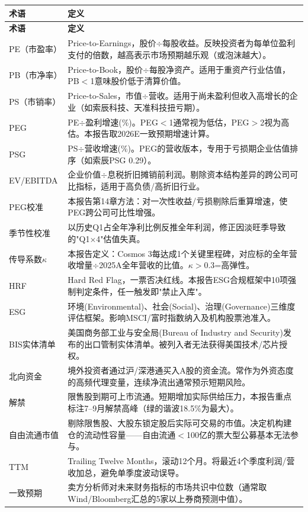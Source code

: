 \begin{longtable}{L{3.2cm} p{11.5cm}}
\toprule
\textbf{术语} & \textbf{定义} \\
\midrule
\endfirsthead
\midrule
\textbf{术语} & \textbf{定义} \\
\midrule
\endhead
\bottomrule
\endfoot

PE（市盈率） & Price-to-Earnings，股价$\div$每股收益。反映投资者为每单位盈利支付的倍数，越高表示市场预期越乐观（或泡沫越大）。 \\
PB（市净率） & Price-to-Book，股价$\div$每股净资产。适用于重资产行业估值，PB$<$1意味股价低于清算价值。 \\
PS（市销率） & Price-to-Sales，市值$\div$营收。适用于尚未盈利但收入高增长的企业（如索辰科技、天准科技扭亏期）。 \\
PEG & PE$\div$盈利增速(\%)。PEG$<$1通常视为低估，PEG$>$2视为高估。本报告取2026E一致预期增速计算。 \\
PSG & PS$\div$营收增速(\%)。PEG的营收版本，专用于亏损期企业估值排序（如索辰PSG 0.29）。 \\
EV/EBITDA & 企业价值$\div$息税折旧摊销前利润。剔除资本结构差异的跨公司可比指标，适用于高负债/高折旧行业。 \\
PEG校准 & 本报告第14章方法：对一次性收益/亏损剔除后重算增速，使PEG跨公司可比性增强。 \\
季节性校准 & 以历史Q1占全年净利比例反推全年利润，修正因淡旺季导致的"Q1$\times$4"估值失真。 \\
传导系数$\kappa$ & 本报告定义：Cosmos 3每达成1个关键里程碑，对应标的全年营收增量$\div$2025A全年营收的比值。$\kappa>0.3$=高弹性。 \\
HRF & Hard Red Flag，一票否决红线。本报告ESG合规框架中10项强制判定条件，任一触发即"禁止入库"。 \\
ESG & 环境(Environmental)、社会(Social)、治理(Governance)三维度评估框架。影响MSCI/富时指数纳入及机构股票池准入。 \\
BIS实体清单 & 美国商务部工业与安全局(Bureau of Industry and Security)发布的出口管制实体清单。被列入者无法获得美国技术/芯片授权。 \\
北向资金 & 境外投资者通过沪/深港通买入A股的资金流。常作为外资态度的高频代理变量，连续净流出通常预示短期风险。 \\
解禁 & 限售股到期可上市流通。短期增加实际供给压力，本报告重点标注7--9月解禁高峰（绿的谐波18.5\%为最大）。 \\
自由流通市值 & 剔除限售股、大股东锁定股后实际可交易的市值。决定机构建仓的流动性容量——自由流通$<$100亿的票大型公募基本无法参与。 \\
TTM & Trailing Twelve Months，滚动12个月。将最近4个季度利润/营收加总，避免单季度波动误导。 \\
一致预期 & 卖方分析师对未来财务指标的市场共识中位数（通常取Wind/Bloomberg汇总的5家以上券商预测中值）。 \\

\end{longtable}
